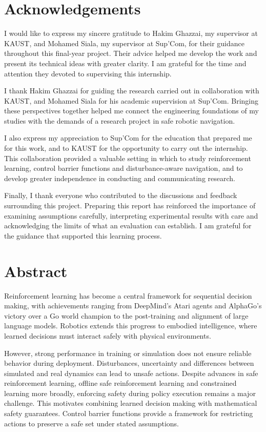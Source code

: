 \chapter*{Acknowledgements}
I would like to express my sincere gratitude to Hakim Ghazzai, my supervisor at KAUST, and Mohamed Siala, my supervisor at Sup'Com, for their guidance throughout this final-year project. Their advice helped me develop the work and present its technical ideas with greater clarity. I am grateful for the time and attention they devoted to supervising this internship.

I thank Hakim Ghazzai for guiding the research carried out in collaboration with KAUST, and Mohamed Siala for his academic supervision at Sup'Com. Bringing these perspectives together helped me connect the engineering foundations of my studies with the demands of a research project in safe robotic navigation.

I also express my appreciation to Sup'Com for the education that prepared me for this work, and to KAUST for the opportunity to carry out the internship. This collaboration provided a valuable setting in which to study reinforcement learning, control barrier functions and disturbance-aware navigation, and to develop greater independence in conducting and communicating research.

Finally, I thank everyone who contributed to the discussions and feedback surrounding this project. Preparing this report has reinforced the importance of examining assumptions carefully, interpreting experimental results with care and acknowledging the limits of what an evaluation can establish. I am grateful for the guidance that supported this learning process.

\clearpage
\chapter*{Abstract}
Reinforcement learning has become a central framework for sequential decision making, with achievements ranging from DeepMind's Atari agents and AlphaGo's victory over a Go world champion to the post-training and alignment of large language models. Robotics extends this progress to embodied intelligence, where learned decisions must interact safely with physical environments.

However, strong performance in training or simulation does not ensure reliable behavior during deployment. Disturbances, uncertainty and differences between simulated and real dynamics can lead to unsafe actions. Despite advances in safe reinforcement learning, offline safe reinforcement learning and constrained learning more broadly, enforcing safety during policy execution remains a major challenge. This motivates combining learned decision making with mathematical safety guarantees. Control barrier functions provide a framework for restricting actions to preserve a safe set under stated assumptions.

